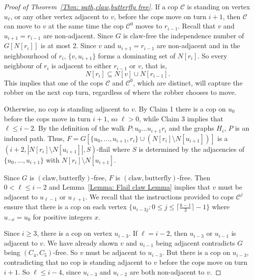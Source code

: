 \documentclass[12pt]{article}
\theoremstyle{definition}
\def\claw{\text{claw}}
\def\butterfly{\text{butterfly}}
\begin{document}
\begin{proof}[Proof of Theorem~\ref{Thm: path,claw,butterfly free}]
If a cop $\mathcal{C}$ is standing on vertex $u_\ell$, or any other vertex adjacent to $v$,
before the cops move on turn $i+1$,
then $\mathcal{C}$ can move to $v$ at the same time the cop $\mathcal{C}^0$ moves to $r_{i-1}$.
Recall that $v$ and $u_{i+1} = r_{i-1}$ are non-adjacent.
Since $G$ is $\claw$-free the independence number of $G[N[r_i]]$ is at most $2$.
Since  $v$ and $u_{i+1} = r_{i-1}$ are non-adjacent and in the neighbourhood of $r_i$, $\{v,u_{i+1}\}$ forms a dominating set of $N[r_i]$. 
So every neighbour of $r_i$ is adjacent to either $r_{i-1}$ or $v$, that is,
\[
N[r_i] \subseteq N[v] \cup N[r_{i-1}].
\]
This implies that one of the cops $\mathcal{C}$ and $\mathcal{C}^0$, which are distinct, will capture the robber on the next cop turn, regardless of where the robber chooses to move.



Otherwise, no cop is standing adjacent to $v$.
By Claim 1 there is a cop on $u_0$ before the cops move in turn $i+1$,
so $\ell> 0$,
while Claim 3 implies that $\ell \leq i-2$.
By the definition of the walk $P: u_0\dots u_{i+1}r_i$ and the graphs $H_{i}$, $P$ is an induced path.
Thus, $F = G[\{u_0,\dots, u_{i+1},r_i\} \cup ( N[r_{i}]\setminus N[u_{i+1}])]$ 
is a $(i+2,|N[r_{i}]\setminus N[u_{i+1}]|, S)$-flail where $S$ is determined by the adjacencies of 
$\{u_0,\dots, u_{i+1}\}$ with $N[r_{i}]\setminus N[u_{i+1}]$.

Since $G$ is $(\claw,\butterfly)$-free, $F$ is $(\claw,\butterfly)$-free.
Then $0 < \ell \leq i-2$ and
Lemma~\ref{Lemma: Flail claw Lemma} implies that 
$v$ must be adjacent to $u_{\ell-1}$ or $u_{\ell+1}$.
We recall that 
the instructions provided to cops $\mathcal{C}^j$ ensure that there is a cop on each vertex 
$\{u_{i-3j}: 0 \leq j \leq \lceil \frac{k-1}{3}\rceil-1\}$ where $u_{-x} = u_0$ for positive integers $x$.

Since $i\geq 3$, there is a cop on vertex $u_{i-3}$.
If $\ell = i-2$, then $u_{i-3}$ or $u_{i-1}$ is adjacent to $v$.
We have already shown $v$ and  $u_{i-1}$ being adjacent contradicts $G$ being $(C_4,C_5)$-free.
So $v$ must be adjacent to $u_{i-3}$.
But there is a cop on $u_{i-3}$, contradicting that  no cop is standing adjacent to $v$ before the cops move on turn $i+1$.
So $\ell \leq i-4$, since $u_{i-3}$ and $u_{i-2}$ are both non-adjacent to $v$.



\end{proof}
\end{document}
